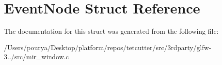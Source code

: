 \hypertarget{structEventNode}{}\section{Event\+Node Struct Reference}
\label{structEventNode}


The documentation for this struct was generated from the following file\+:\begin{DoxyCompactItemize}
\item 
/\+Users/pourya/\+Desktop/platform/repos/tetcutter/src/3rdparty/glfw-\/3../src/mir\+\_\+window.\+c\end{DoxyCompactItemize}
